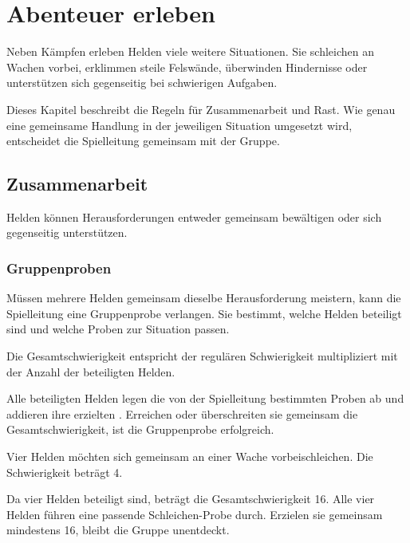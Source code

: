 \chapter{Abenteuer erleben}
\label{chap:adventures}

Neben Kämpfen erleben Helden viele weitere Situationen. Sie schleichen an Wachen vorbei, erklimmen steile Felswände, überwinden Hindernisse oder unterstützen sich gegenseitig bei schwierigen Aufgaben.

Dieses Kapitel beschreibt die Regeln für Zusammenarbeit und Rast. Wie genau eine gemeinsame Handlung in der jeweiligen Situation umgesetzt wird, entscheidet die Spielleitung gemeinsam mit der Gruppe.

\section{Zusammenarbeit}

Helden können Herausforderungen entweder gemeinsam bewältigen oder sich gegenseitig unterstützen.

\subsection{Gruppenproben}

Müssen mehrere Helden gemeinsam dieselbe Herausforderung meistern, kann die Spielleitung eine Gruppenprobe verlangen. Sie bestimmt, welche Helden beteiligt sind und welche Proben zur Situation passen.

\begin{kurzregel}[title=Gruppenprobe]
Die Gesamtschwierigkeit entspricht der regulären Schwierigkeit multipliziert mit der Anzahl der beteiligten Helden.

Alle beteiligten Helden legen die von der Spielleitung bestimmten Proben ab und addieren ihre erzielten \star{}. Erreichen oder überschreiten sie gemeinsam die Gesamtschwierigkeit, ist die Gruppenprobe erfolgreich.
\end{kurzregel}

\begin{beispiel}[title=Beispiel: Gemeinsam schleichen]
Vier Helden möchten sich gemeinsam an einer Wache vorbeischleichen. Die Schwierigkeit beträgt 4.

Da vier Helden beteiligt sind, beträgt die Gesamtschwierigkeit 16\star. Alle vier Helden führen eine passende Schleichen-Probe durch. Erzielen sie gemeinsam mindestens 16\star, bleibt die Gruppe unentdeckt.
\end{beispiel}

